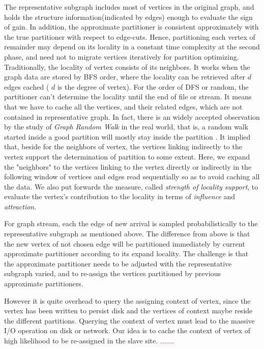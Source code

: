 \documentclass{sig-alternate-2013}
\begin{document}
The representative subgraph includes most of vertices in the original graph, and holds the structure information(indicated by edges) enough to evaluate the sign of gain. In addition, the approximate partitioner is consistent approximately with the true partitioner with respect to edge-cuts. Hence, partitioning each vertex of remainder may depend on its locality in a constant time complexity at the second phase, and need not to migrate vertices iteratively for partition optimizing. Traditionally, the locality of vertex consists of its neighbors. It works when the graph data are stored by BFS order, where the locality can be retrieved after $d$ edges cached ( $d$ is the degree of vertex). For the order of DFS or random, the partitioner can't determine the locality until the end of file or stream. It means that we have to cache all the vertices, and their related edges, which are not contained in representative graph. In fact, there is an widely accepted observation by the study of \textit{Graph Random Walk} in the real world, that is, a random walk started inside a good partition will mostly stay inside the partition \cite{DBLP:books/sp/social11}. It implied that, beside for the neighbors of vertex, the vertices linking indirectly to the vertex support the determination of partition to some extent. Here, we expand the "neighbors" to the vertices linking to the vertex directly or indirectly in the following window of vertices and edges read sequentially so as to avoid caching all the data. We also put forwards the measure, called \textit{strength of locality support}, to evaluate the vertex's contribution to the locality in terms of \textit{influence} and \textit{attraction}.

For graph stream, each the edge of new arrival is sampled probabilistically to the representative subgraph as mentioned above. The difference from above is that the new vertex of not chosen edge will be  partitioned immediately by current approximate partitioner according to its expand locality. The challenge is that the approximate partitioner needs to be adjusted with the representative subgraph varied, and to re-assign the vertices partitioned by previous approximate partitioners.

However it is quite overhead to query the assigning context of vertex, since the vertex has been written to persist disk and the vertices of context maybe reside the different partitions. Querying the context of vertex must lead to the massive I/O operation on disk or network. Our idea is to cache the context of vertex of high likelihood to be re-assigned in the slave site.
\textcolor{red}{.......}
\end{document}
